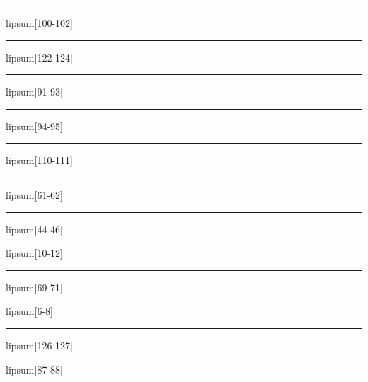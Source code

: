 \documentclass[11pt,a4paper]{article}
\begin{document}
\begin{simplewrap}
  \textcolor{violet!55}{\rule{3.5cm}{5.4cm}}
\end{simplewrap}
lipsum[100-102]

\begin{simplewrap}
  \textcolor{orange!46}{\rule{5.0cm}{7.3cm}}
\end{simplewrap}
lipsum[122-124]

\begin{simplewrap}
  \textcolor{cyan!42}{\rule{3.2cm}{4.1cm}}
\end{simplewrap}
lipsum[91-93]

\begin{simplewrap}
  \textcolor{violet!30}{\rule{3.2cm}{6.7cm}}
\end{simplewrap}
lipsum[94-95]

\begin{simplewrap}
  \textcolor{red!58}{\rule{5.7cm}{4.7cm}}
\end{simplewrap}
lipsum[110-111]

\begin{simplewrap}
  \textcolor{lime!36}{\rule{4.1cm}{7.3cm}}
\end{simplewrap}
lipsum[61-62]

\begin{simplewrap}
  \textcolor{green!54}{\rule{3.2cm}{4.4cm}}
\end{simplewrap}
lipsum[44-46]

lipsum[10-12]

\begin{simplewrap}
  \textcolor{blue!52}{\rule{5.6cm}{6.5cm}}
\end{simplewrap}
lipsum[69-71]

lipsum[6-8]

\begin{simplewrap}
  \textcolor{brown!34}{\rule{4.7cm}{4.6cm}}
\end{simplewrap}
lipsum[126-127]

lipsum[87-88]
\end{document}
